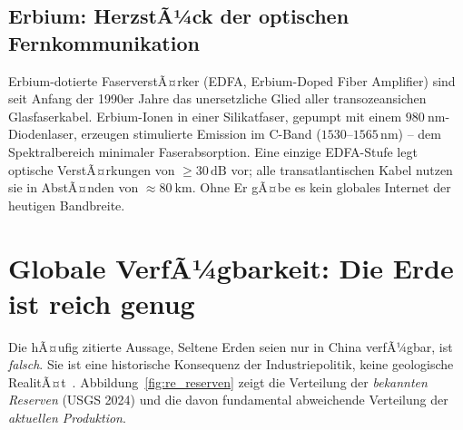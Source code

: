 ﻿\documentclass[12pt, a4paper]{report}
\theoremstyle{definition}
\theoremstyle{remark}
\begin{document}
\subsection{Erbium: HerzstÃ¼ck der optischen Fern\-kommunikation}

Erbium-dotierte FaserverstÃ¤rker (EDFA, Erbium-Doped Fiber Amplifier) sind
seit Anfang der 1990er Jahre das unersetzliche Glied aller transozeansichen
Glasfaserkabel. Erbium-Ionen in einer Silikatfaser, gepumpt mit einem
$\SI{980}{\nano\metre}$-Diodenlaser, erzeugen stimulierte Emission im
C-Band ($1530$--$1565\,\text{nm}$) -- dem Spektralbereich minimaler
Faserabsorption. Eine einzige EDFA-Stufe legt optische VerstÃ¤rkungen von
$\geq 30\,\text{dB}$ vor; alle transatlantischen Kabel nutzen sie in
AbstÃ¤nden von $\approx \SI{80}{\kilo\metre}$. Ohne Er gÃ¤be es kein globales
Internet der heutigen Bandbreite.

\section{Globale VerfÃ¼gbarkeit: Die Erde ist reich genug}
\label{ssec:re_global}

Die hÃ¤ufig zitierte Aussage, Seltene Erden seien nur in China verfÃ¼gbar, ist
\emph{falsch}. Sie ist eine historische Konsequenz der Industriepolitik, keine
geologische RealitÃ¤t~\cite{alonso2012}. Abbildung~\ref{fig:re_reserven} zeigt
die Verteilung der \emph{bekannten Reserven} (USGS 2024) und die davon
fundamental abweichende Verteilung der \emph{aktuellen Produktion}.
\end{document}

